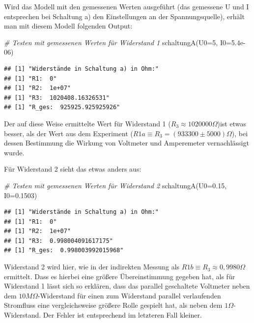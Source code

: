 \documentclass[
  9pt,
]{article}
\newenvironment{Shaded}{\begin{snugshade}}{\end{snugshade}}
\newcommand{\AttributeTok}[1]{\textcolor[rgb]{0.77,0.63,0.00}{#1}}
\newcommand{\CommentTok}[1]{\textcolor[rgb]{0.56,0.35,0.01}{\textit{#1}}}
\newcommand{\DecValTok}[1]{\textcolor[rgb]{0.00,0.00,0.81}{#1}}
\newcommand{\FloatTok}[1]{\textcolor[rgb]{0.00,0.00,0.81}{#1}}
\newcommand{\FunctionTok}[1]{\textcolor[rgb]{0.00,0.00,0.00}{#1}}
\newcommand{\NormalTok}[1]{#1}
\begin{document}
Wird das Modell mit den gemessenen Werten ausgeführt (das gemessene U
und I entsprechen bei Schaltung a) den Einstellungen an der
Spannungsquelle), erhält man mit diesem Modell folgenden Output:

\begin{Shaded}
\begin{Highlighting}[]
\CommentTok{\# Testen mit gemessenen Werten für Widerstand 1}
\FunctionTok{schaltungA}\NormalTok{(}\AttributeTok{U0=}\DecValTok{5}\NormalTok{, }\AttributeTok{I0=}\FloatTok{5.4e{-}06}\NormalTok{)}
\end{Highlighting}
\end{Shaded}

\begin{verbatim}
## [1] "Widerstände in Schaltung a) in Ohm:"
## [1] "R1:  0"
## [1] "R2:  1e+07"
## [1] "R3:  1020408.16326531"
## [1] "R_ges:  925925.925925926"
\end{verbatim}

Der auf diese Weise ermittelte Wert für Widerstand 1
(\(R_3\approx 1020000\Omega\))ist etwas besser, als der Wert aus dem
Experiment (\(R1a \equiv R_3 = (933300 \pm 5000)\Omega\)), bei dessen
Bestimmung die Wirkung von Voltmeter und Amperemeter vernachlässigt
wurde.

Für Widerstand 2 sieht das etwas anders aus:

\begin{Shaded}
\begin{Highlighting}[]
\CommentTok{\# Testen mit gemessenen Werten für Widerstand 2}
\FunctionTok{schaltungA}\NormalTok{(}\AttributeTok{U0=}\FloatTok{0.15}\NormalTok{, }\AttributeTok{I0=}\FloatTok{0.1503}\NormalTok{)}
\end{Highlighting}
\end{Shaded}

\begin{verbatim}
## [1] "Widerstände in Schaltung a) in Ohm:"
## [1] "R1:  0"
## [1] "R2:  1e+07"
## [1] "R3:  0.998004091617175"
## [1] "R_ges:  0.998003992015968"
\end{verbatim}

Widerstand 2 wird hier, wie in der indirekten Messung als
\(R1b\equiv R_3 \approx 0,9980\Omega\) ermittelt. Dass es hierbei eine
größere Übereinstimmung gegeben hat, als für Widerstand 1 lässt sich so
erklären, dass das parallel geschaltete Voltmeter neben dem
\(10M\Omega\)-Widerstand für einen zum Widerstand parallel verlaufenden
Stromfluss eine vergleichsweise größere Rolle gespielt hat, als neben
dem \(1\Omega\)-Widerstand. Der Fehler ist entsprechend im letzteren
Fall kleiner.
\end{document}
